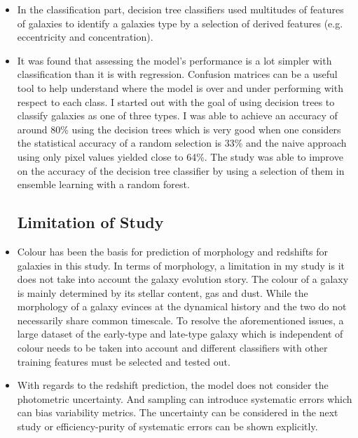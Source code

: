 \begin{itemize}
	\item In the classification part, decision tree classifiers used multitudes of features of galaxies to identify a galaxies type by a selection of derived features (e.g. eccentricity and concentration).
	
	\item It was found that assessing the model's performance is a lot simpler with classification than it is with regression. Confusion matrices can be a useful tool to help understand where the model is over and under performing with respect to each class. I started out with the goal of using decision trees to classify galaxies as one of three types. I was able to achieve an accuracy of around 80\% using the decision trees which is very good when one considers the statistical accuracy of a random selection is 33\% and the naive approach using only pixel values yielded close to 64\%. The study was able to improve on the accuracy of the decision tree classifier by using a selection of them in ensemble learning with a random forest.
	
	\subsection{Limitation of Study}
	\item Colour has been the basis for prediction of morphology and redshifts for galaxies in this study. In terms of morphology, a limitation in my study is it does not take into account the galaxy evolution story. The colour of a galaxy is mainly determined by its stellar content, gas and dust. While the morphology of a galaxy evinces at the dynamical history and the two do not necessarily share common timescale. To resolve the aforementioned issues, a large dataset of the early-type and late-type galaxy which is independent of colour needs to be taken into account and different classifiers with other training features must be selected and tested out.
	\item With regards to the redshift prediction, the model does not consider the photometric uncertainty. And sampling can introduce systematic errors which can bias variability metrics. The uncertainty can be considered in the next study or efficiency-purity of systematic errors can be shown explicitly.
\end{itemize}
